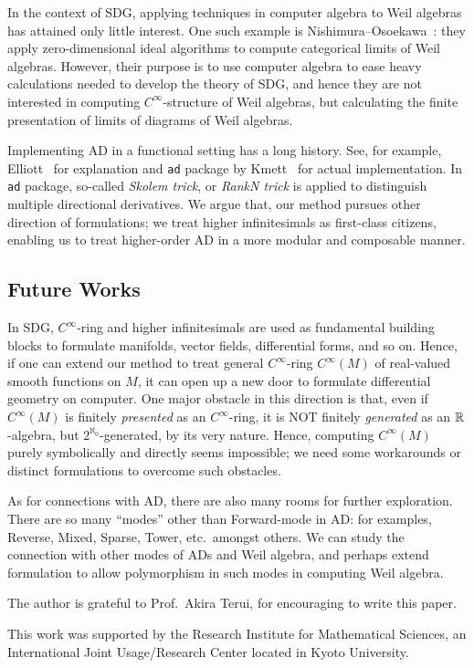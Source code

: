\documentclass[%
  sigconf,authorversion,screen]{acmart}
\begin{document}
In the context of SDG, applying techniques in computer algebra to Weil algebras has attained only little interest.
One such example is Nishimura--Osoekawa~\cite{Nishimura:2007aa}: they apply zero-dimensional ideal algorithms to compute categorical limits of Weil algebras.
However, their purpose is to use computer algebra to ease heavy calculations needed to develop the theory of SDG, and hence they are not interested in computing $C^\infty$-structure of Weil algebras, but calculating the finite presentation of limits of diagrams of Weil algebras.

Implementing AD in a functional setting has a long history.
See, for example, Elliott~\cite{Elliott2009-beautiful-differentiation} for explanation and \texttt{ad} package by Kmett~\cite{Kmett:2010aa} for actual implementation.
In \texttt{ad} package, so-called \emph{Skolem trick}, or \emph{RankN trick} is applied to distinguish multiple directional derivatives.
We argue that, our method pursues other direction of formulations; we treat higher infinitesimals as first-class citizens, enabling us to treat higher-order AD in a more modular and composable manner.

\subsection{Future Works}
In SDG, $C^\infty$-ring and higher infinitesimals are used as fundamental building blocks to formulate manifolds, vector fields, differential forms, and so on.
Hence, if one can extend our method to treat general $C^\infty$-ring $C^\infty(M)$ of real-valued smooth functions on $M$, it can open up a new door to formulate differential geometry on computer.
One major obstacle in this direction is that, even if $C^\infty(M)$ is finitely \emph{presented} as an $C^\infty$-ring, it is NOT finitely \emph{generated} as an $\mathbb{R}$-algebra, but $2^{\aleph_0}$-generated, by its very nature.
Hence, computing $C^\infty(M)$ purely symbolically and directly seems impossible; we need some workarounds or distinct formulations to overcome such obstacles.

As for connections with AD, there are also many rooms for further exploration.
There are so many ``modes'' other than Forward-mode in AD: for examples, Reverse, Mixed, Sparse, Tower, etc.\ amongst others.
We can study the connection with other modes of ADs and Weil algebra, and perhaps extend formulation to allow polymorphism in such modes in computing Weil algebra.

\begin{acks}
The author is grateful to Prof.\ Akira Terui, for encouraging  to write this paper.

This work was supported by the Research Institute for Mathematical Sciences,
an International Joint Usage/Research Center located in Kyoto University.
\end{acks}



\end{document}
